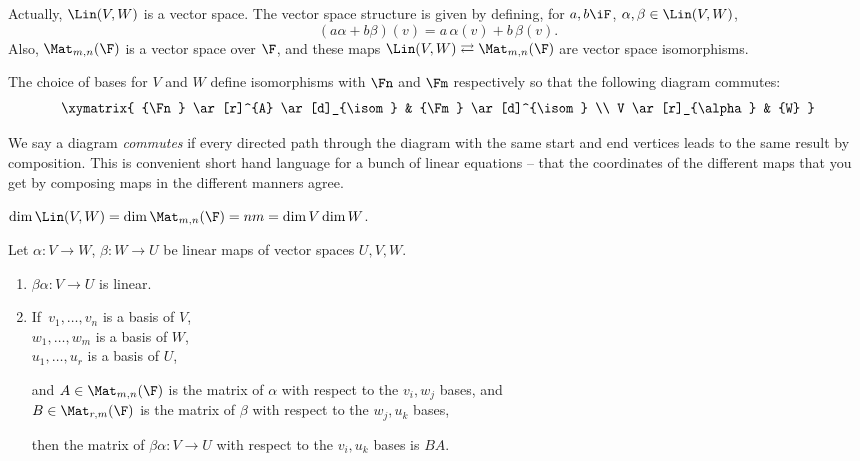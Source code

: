 \begin{remark}
	Actually, $\Lin(V,W)$ is a vector space. The vector space structure is given by defining, for  $a,b\iF$, $\alpha,\beta\in \Lin(V,W)$, %
	\begin{equation*}
		\left( a\alpha+b\beta \right)(v) = a\,\alpha(v)+b\,\beta(v).
	\end{equation*}
	Also, $\Mat_{m,n}(\F)$ is a vector space over $\F$, and these maps $\Lin(V,W) \rightleftarrows \Mat_{m,n}(\F)$ are vector space isomorphisms. %

	The choice of bases for $V$ and $W$ define isomorphisms with $\Fn$ and $\Fm$ respectively so that the following diagram commutes: %
	\begin{equation*}
		\xymatrix{
			{\Fn} \ar[r]^{A} \ar[d]_{\isom} & {\Fm} \ar[d]^{\isom} \\
			V \ar[r]_{\alpha} & {W}
		}
	\end{equation*}

We say a diagram \emph{commutes} if every directed path through the diagram with the same start and end vertices leads to the same result by composition. This is convenient short hand language for a bunch of linear equations -- that the coordinates of the different maps that you get by composing maps in the different manners agree. %

\end{remark}

\begin{corollary}
	$\dim \Lin(V,W) = \dim \Mat_{m,n} (\F) = nm = \dim V \dim
	W$. %
\end{corollary}

\begin{lemma}
	Let $\alpha:V\to W$, $\beta:W\to U$ be linear maps of vector spaces $U, V, W$. %
	\begin{enumerate}
		\shortskip
		\item $\beta\alpha:V\to U$ is linear.
		\item If\, $v_1,\ldots,v_n$ is a basis of $V$, \\
		\phantom{If\,} $w_1,\ldots,w_m$ is a basis of $W$, \\
		\phantom{If\,} $u_1,\ldots,u_r$ is a basis of $U$,
		
		and $A\in\Mat_{m,n}(\F)$ is the matrix of $\alpha$ with respect to the $v_i,w_{j}$ bases, and \\ %
		\phantom{and} $B\in\Mat_{r,m}(\F)$ is the matrix of $\beta$ with respect to the $w_{j},u_k$ bases, %

		then the matrix of $\beta\alpha:V\to U$ with respect to the $v_i,u_k$ bases is $BA$. %
	\end{enumerate}
\end{lemma}

